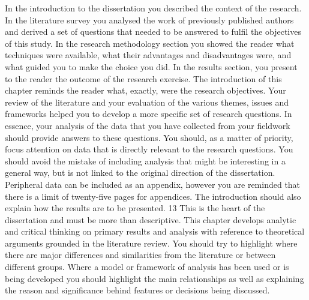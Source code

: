 In the introduction to the dissertation you described the context of the
research. In the literature survey you analysed the work of previously
published authors and derived a set of questions that needed to be answered to
fulfil the objectives of this study. In the research methodology section you
showed the reader what techniques were available, what their advantages and
disadvantages were, and what guided you to make the choice you did. In the
results section, you present to the reader the outcome of the research exercise.
The introduction of this chapter reminds the reader what, exactly, were the
research objectives. Your review of the literature and your evaluation of the
various themes, issues and frameworks helped you to develop a more specific
set of research questions. In essence, your analysis of the data that you have
collected from your fieldwork should provide answers to these questions. You
should, as a matter of priority, focus attention on data that is directly relevant to
the research questions. You should avoid the mistake of including analysis that
might be interesting in a general way, but is not linked to the original direction
of the dissertation. Peripheral data can be included as an appendix, however
you are reminded that there is a limit of twenty-five pages for appendices.
The introduction should also explain how the results are to be presented.
13
This is the heart of the dissertation and must be more than descriptive.
This chapter develops analytic and critical thinking on primary results and
analysis with reference to theoretical arguments grounded in the literature
review. You should try to highlight where there are major differences and
similarities from the literature or between different groups. Where a model or
framework of analysis has been used or is being developed you should
highlight the main relationships as well as explaining the reason and
significance behind features or decisions being discussed.